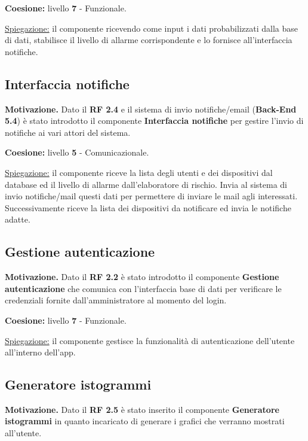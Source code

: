 \vspace{5mm}
\noindent
\textbf{Coesione:} livello \textbf{7} - Funzionale.

\noindent
\underline{Spiegazione:} il componente ricevendo come input i dati probabilizzati dalla base di dati, stabilisce il livello di allarme corrispondente e lo fornisce all'interfaccia notifiche.

\subsection{Interfaccia notifiche}
\textbf{Motivazione.} Dato il \textbf{RF 2.4} e il sistema di invio notifiche/email (\textbf{Back-End 5.4}) è stato introdotto il componente \textbf{Interfaccia notifiche} per gestire l'invio di notifiche ai vari attori del sistema.

\vspace{5mm}
\noindent
\textbf{Coesione:} livello \textbf{5} - Comunicazionale.

\noindent
\underline{Spiegazione:} il componente riceve la lista degli utenti e dei dispositivi dal database ed il livello di allarme dall'elaboratore di rischio. Invia al sistema di invio notifiche/mail questi dati per permettere di inviare le mail agli interessati. Successivamente riceve la lista dei dispositivi da notificare ed invia le notifiche adatte.

\subsection{Gestione autenticazione}
\textbf{Motivazione.} Dato il \textbf{RF 2.2} è stato introdotto il componente \textbf{Gestione autenticazione} che comunica con l'interfaccia base di dati per verificare le credenziali fornite dall'amministratore al momento del login.

\vspace{5mm}
\noindent
\textbf{Coesione:} livello \textbf{7} - Funzionale.

\noindent
\underline{Spiegazione:} il componente gestisce la funzionalità di autenticazione dell'utente all'interno dell'app.

\subsection{Generatore istogrammi}
\textbf{Motivazione.} Dato il \textbf{RF 2.5} è stato inserito il componente \textbf{Generatore istogrammi} in quanto incaricato di generare i grafici che verranno mostrati all'utente.

